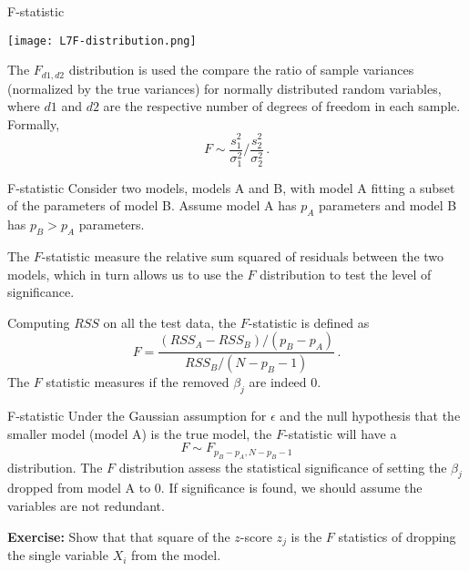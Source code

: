 \documentclass[10pt, table, dvipsnames,xcdraw, handout ]{beamer}
\begin{document}
\begin{frame}[fragile]{F-statistic}
  \begin{minipage}[t][0.5\textheight][t]{\textwidth}
	\centering \texttt{[image: L7F-distribution.png]} 
  \end{minipage}
  \vfill
\begin{minipage}[t][0.5\textheight][t]{\textwidth}
The $F_{d1,d2}$ distribution is used the compare the ratio of sample variances (normalized by the true variances) for normally distributed random variables, where $d1$ and $d2$ are the respective number of degrees of freedom in each sample. \pause Formally, 
$$
F \sim \frac{s_1^2}{\sigma_1^2}\big/ \frac{s_2^2}{\sigma_2^2}\,.
$$
\end{minipage}


\end{frame}



\begin{frame}[fragile]{F-statistic}
Consider two models, models A and B, with model A fitting a subset of the parameters of model B. Assume model A has $p_A$ parameters and model B has $p_B>p_A$ parameters. \pause

The $F$-statistic measure the relative sum squared of residuals between the two models, which in turn allows us to use the $F$ distribution to test the level of significance. \pause 

Computing $RSS$ on all the test data, the $F$-statistic is defined as 
$$
F = \frac{(RSS_A - RSS_B)/(p_B-p_A)}{RSS_B/(N-p_B-1)}\,.
$$
The $F$ statistic measures if the removed $\beta_j$ are indeed 0. 
\end{frame}




\begin{frame}[fragile]{F-statistic}
Under the Gaussian assumption for $\epsilon$ and the null hypothesis that the smaller model (model A) is the true model, the $F$-statistic will have a 
$$
F\sim F_{p_B-p_A,N-p_B - 1}
$$
distribution. \pause The $F$ distribution assess the statistical significance of setting the $\beta_j$ dropped from model A to 0. If significance is found, we should assume the variables are not redundant. \pause\newline

\textbf{Exercise:} Show that that square of the $z$-score $z_j$ is the $F$ statistics of dropping the single variable $X_i$ from the model. 
\end{frame}
\end{document}
